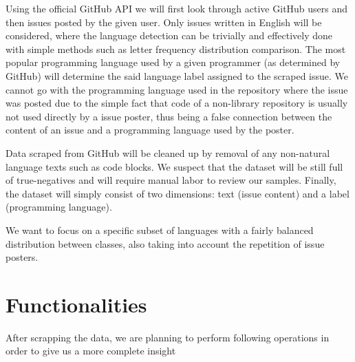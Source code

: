 \documentclass[]{article}
\begin{document}
Using the official GitHub API we will first look through active GitHub users and then issues posted by the given user. Only issues written in English will be considered, where the language detection can be trivially and effectively done with simple methods such as letter frequency distribution comparison. The most popular programming language used by a given programmer (as determined by GitHub) will determine the said language label assigned to the scraped issue. We cannot go with the programming language used in the repository where the issue was posted due to the simple fact that code of a non-library repository is usually not used directly by a issue poster, thus being a false connection between the content of an issue and a programming language used by the poster.

Data scraped from GitHub will be cleaned up by removal of any non-natural language texts such as code blocks. We suspect that the dataset will be still full of true-negatives and will require manual labor to review our samples. Finally, the dataset will simply consist of two dimensions: text (issue content) and a label (programming language).

We want to focus on a specific subset of languages with a fairly balanced distribution between classes, also taking into account the repetition of issue posters.

\section{Functionalities}

After scrapping the data, we are planning to perform following operations in order to give us a more complete insight
\end{document}
